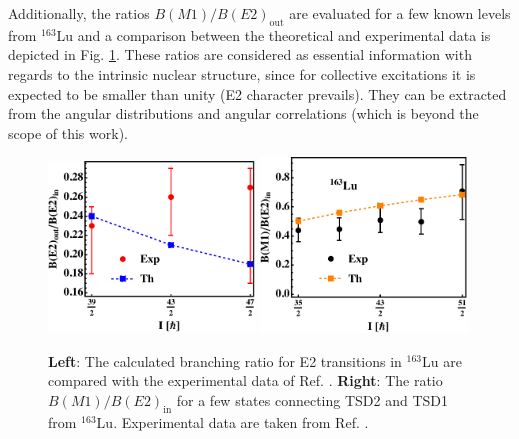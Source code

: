 Additionally, the ratios $B(M1)/B(E2)_\text{out}$ are evaluated for a few known levels from $^{163}$Lu and a comparison between the theoretical and experimental data is depicted in Fig. \ref{figs-ratio-BM1-BE2-IN-OUT}. These ratios are considered as essential information with regards to the intrinsic nuclear structure, since for collective excitations it is expected to be smaller than unity (E2 character prevails). They can be extracted from the angular distributions and angular correlations \cite{lvThesis} (which is beyond the scope of this work).
\begin{figure}
    \centering
    \includegraphics[width=0.49\textwidth]{Chapters/Figures/BE2inout-3.pdf}
    \includegraphics[width=0.49\textwidth]{Chapters/Figures/BE2inout-4.pdf}
    \caption{\textbf{Left}: The calculated branching ratio for E2 transitions in $^{163}$Lu are compared with the experimental data of Ref. \cite{amro2003wobbling}. \textbf{Right}: The ratio $B(M1)/B(E2)_\text{in}$ for a few states connecting TSD2 and TSD1 from $^{163}$Lu. Experimental data are taken from Ref. \cite{reich2010nuclear}.}
    \label{figs-ratio-BM1-BE2-IN-OUT}
\end{figure}